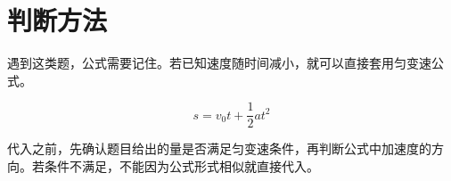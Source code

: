 \section{判断方法}

遇到这类题，公式需要记住。若已知速度随时间减小，就可以直接套用匀变速公式。

\begin{equation}
  s=v_0t+\frac{1}{2}at^2
\end{equation}

代入之前，先确认题目给出的量是否满足匀变速条件，再判断公式中加速度的方向。若条件不满足，不能因为公式形式相似就直接代入。
